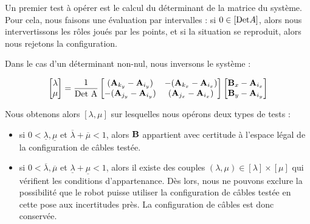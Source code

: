Un premier test \`a op\'erer est le calcul du d\'eterminant de la matrice du 
syst\`eme. Pour cela, nous faisons une \'evaluation par intervalles : si $0 \in 
[\hbox{Det}A]$, alors nous intervertissons les r\^oles jou\'es par les points, 
et si la situation se reproduit, alors nous rejetons la configuration.

Dans le cas d'un d\'eterminant non-nul, nous inversons le syst\`eme :

\begin{equation}
\begin{bmatrix}
\lambda \\
\mu
\end{bmatrix} = \frac 1 {\hbox{Det A}}
\begin{bmatrix}
({\bf A}_{k_y} - {\bf A}_{i_y}) & -({\bf A}_{k_x} 
- {\bf A}_{i_x}) \\
-({\bf A}_{j_y} - {\bf A}_{i_y}) & ({\bf A}_{j_x} - {\bf A}_{i_x}) 
\end{bmatrix}
\begin{bmatrix}
{\bf B}_{x} - {\bf A}_{i_x} \\
{\bf B}_{y} - {\bf A}_{i_y}
\end{bmatrix}
\label{chap01:eq19}
\end{equation}

Nous obtenons alors $[\lambda, \mu]$ sur lesquelles nous op\'erons deux types 
de tests :
\begin{itemize}
 \item si $0 < \underline{\lambda}, \underline{\mu}$ et $\overline{\lambda} + 
\overline{\mu} < 1$, alors $\bf B$ appartient avec certitude \`a l'espace 
l\'egal de la configuration de c\^ables test\'ee.
 \item si $0 < \overline{\lambda}, \overline{\mu}$ et $\underline{\lambda} + 
\underline{\mu} < 1$, alors il existe des couples $(\lambda, \mu) \in 
[\lambda]\times[\mu]$ qui v\'erifient les conditions d'appartenance. D\`es 
lors, nous ne pouvons exclure la possibilit\'e que le robot puisse utiliser la 
configuration de c\^ables test\'ee en cette pose aux incertitudes pr\`es. La 
configuration de c\^ables est donc conserv\'ee.
\end{itemize}

